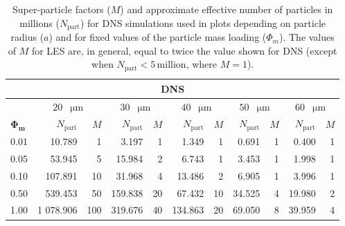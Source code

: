 \documentclass{pracamgren}
\begin{document}
\begin{table}[h]
\centering
\scriptsize
\begin{tabular}{l|rr|rr|rr|rr|rr}
\multicolumn{11}{c}{\textbf{DNS}} \\ \hline
& \multicolumn{2}{c|}{$20$~$\upmu\text{m}$} & \multicolumn{2}{c|}{$30$~$\upmu\text{m}$} & \multicolumn{2}{c|}{$40$~$\upmu\text{m}$} & \multicolumn{2}{c|}{$50$~$\upmu\text{m}$} & \multicolumn{2}{c}{$60$~$\upmu\text{m}$} \\
$\mathbf{\Phi_m}$ & $N_{\text{part}}$ & $M$ & $N_{\text{part}}$ & $M$ & $N_{\text{part}}$ & $M$ & $N_{\text{part}}$ & $M$ & $N_{\text{part}}$ & $M$ \\ \hline
0.01 & 10.789 & 1 & 3.197 & 1 & 1.349 & 1 & 0.691 & 1 & 0.400 & 1 \\ 
0.05 & 53.945 & 5 & 15.984 & 2 & 6.743 & 1 & 3.453 & 1 & 1.998 & 1 \\ 
0.10 & 107.891 & 10 & 31.968 & 4 & 13.486 & 2 & 6.905 & 1 & 3.996 & 1 \\ 
0.50 & 539.453 & 50 & 159.838 & 20 & 67.432 & 10 & 34.525 & 4 & 19.980 & 2 \\  
1.00 & 1 078.906 & 100 & 319.676 & 40 & 134.863 & 20 & 69.050 & 8 & 39.959 & 4 \\ \hline 
\end{tabular}
\caption{Super-particle factors ($M$) and approximate effective number of particles in millions ($N_{\text{part}}$) for DNS simulations used in plots depending on particle radius ($a$) and for fixed values of the particle mass loading ($\Phi_m$).
The values of $M$ for LES are, in general, equal to twice the value shown for DNS (except when $N_{\text{part}} < 5 \, \text{million}$, where $M=1$).
}
\label{tab:spp-phic}
\end{table}
\end{document}
